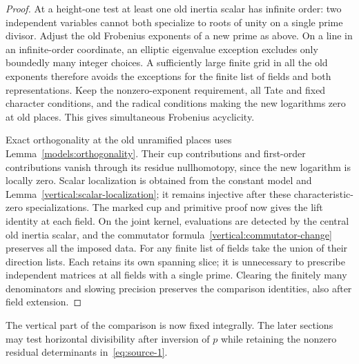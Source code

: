 \begin{proof}
At a height-one test at least one old inertia scalar has
infinite order: two independent variables cannot both
specialize to roots of unity on a single prime divisor.
Adjust the old Frobenius exponents of a new prime as above.
On a line in an infinite-order coordinate, an elliptic
eigenvalue exception excludes only boundedly many integer
choices.  A sufficiently large finite grid in all the old
exponents therefore avoids the exceptions for the finite
list of fields and both representations.  Keep the
nonzero-exponent requirement, all Tate and fixed character
conditions, and the radical conditions making the new
logarithms zero at old places.  This gives simultaneous
Frobenius acyclicity.

Exact orthogonality at the old unramified places uses
Lemma~\ref{models:orthogonality}.  Their cup contributions
and first-order contributions vanish through its residue
nullhomotopy, since the new logarithm is locally zero.
Scalar localization is obtained from the constant model
and Lemma~\ref{vertical:scalar-localization}; it remains
injective after these characteristic-zero specializations.
The marked cup and primitive proof now gives the lift
identity at each field.  On the joint kernel, evaluations
are detected by the central old inertia scalar, and the
commutator formula~\eqref{vertical:commutator-change}
preserves all the imposed data.  For any finite list of
fields take the union of their direction lists.  Each
retains its own spanning slice; it is unnecessary to
prescribe independent matrices at all fields with a single
prime.  Clearing the finitely many denominators and slowing
precision preserves the comparison identities, also after
field extension.
\end{proof}

The vertical part of the comparison is now fixed integrally.
The later sections may test horizontal divisibility after
inversion of $p$ while retaining the nonzero residual
determinants in~\eqref{eq:source-1}.

